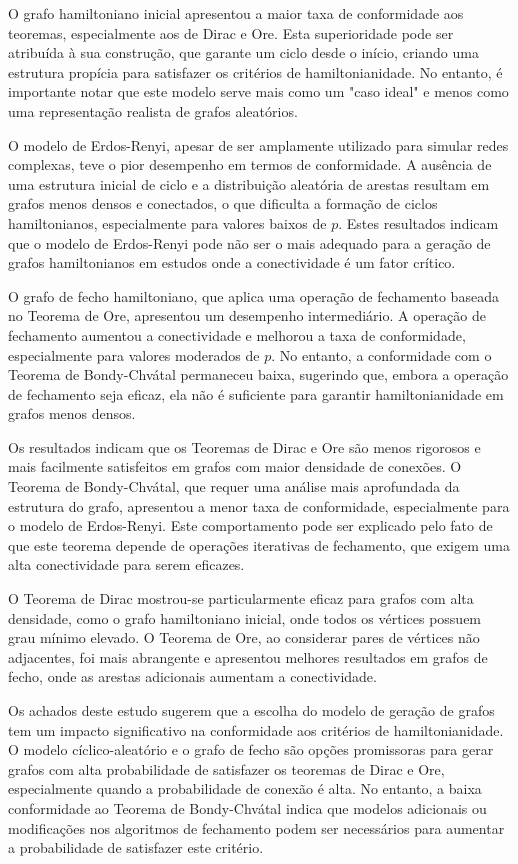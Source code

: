 \documentclass[12pt, openright, oneside, a4paper, chapter=TITLE, section=TITLE, subsection=TITLE, subsubsection=TITLE, brazil]{abntex2}
\begin{document}
O grafo hamiltoniano inicial apresentou a maior taxa de conformidade aos teoremas, especialmente aos de Dirac e Ore. Esta superioridade pode ser atribuída à sua construção, que garante um ciclo desde o início, criando uma estrutura propícia para satisfazer os critérios de hamiltonianidade. No entanto, é importante notar que este modelo serve mais como um "caso ideal" e menos como uma representação realista de grafos aleatórios.

O modelo de Erdos-Renyi, apesar de ser amplamente utilizado para simular redes complexas, teve o pior desempenho em termos de conformidade. A ausência de uma estrutura inicial de ciclo e a distribuição aleatória de arestas resultam em grafos menos densos e conectados, o que dificulta a formação de ciclos hamiltonianos, especialmente para valores baixos de \( p \). Estes resultados indicam que o modelo de Erdos-Renyi pode não ser o mais adequado para a geração de grafos hamiltonianos em estudos onde a conectividade é um fator crítico.

O grafo de fecho hamiltoniano, que aplica uma operação de fechamento baseada no Teorema de Ore, apresentou um desempenho intermediário. A operação de fechamento aumentou a conectividade e melhorou a taxa de conformidade, especialmente para valores moderados de \( p \). No entanto, a conformidade com o Teorema de Bondy-Chvátal permaneceu baixa, sugerindo que, embora a operação de fechamento seja eficaz, ela não é suficiente para garantir hamiltonianidade em grafos menos densos.

Os resultados indicam que os Teoremas de Dirac e Ore são menos rigorosos e mais facilmente satisfeitos em grafos com maior densidade de conexões. O Teorema de Bondy-Chvátal, que requer uma análise mais aprofundada da estrutura do grafo, apresentou a menor taxa de conformidade, especialmente para o modelo de Erdos-Renyi. Este comportamento pode ser explicado pelo fato de que este teorema depende de operações iterativas de fechamento, que exigem uma alta conectividade para serem eficazes.

O Teorema de Dirac mostrou-se particularmente eficaz para grafos com alta densidade, como o grafo hamiltoniano inicial, onde todos os vértices possuem grau mínimo elevado. O Teorema de Ore, ao considerar pares de vértices não adjacentes, foi mais abrangente e apresentou melhores resultados em grafos de fecho, onde as arestas adicionais aumentam a conectividade.

Os achados deste estudo sugerem que a escolha do modelo de geração de grafos tem um impacto significativo na conformidade aos critérios de hamiltonianidade. O modelo cíclico-aleatório e o grafo de fecho são opções promissoras para gerar grafos com alta probabilidade de satisfazer os teoremas de Dirac e Ore, especialmente quando a probabilidade de conexão é alta. No entanto, a baixa conformidade ao Teorema de Bondy-Chvátal indica que modelos adicionais ou modificações nos algoritmos de fechamento podem ser necessários para aumentar a probabilidade de satisfazer este critério.
\end{document}
